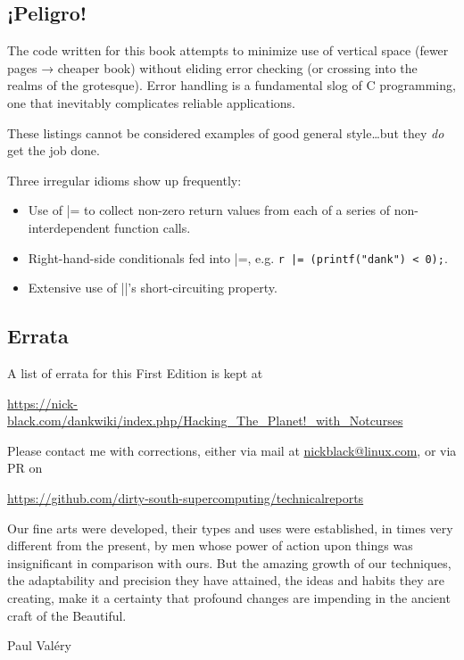 \documentclass[letterpaper,10pt]{article}
\newenvironment{denseitemize}{
  \begin{itemize}
      \setlength{\itemsep}{0pt}
}{
  \end{itemize}
}
\begin{document}
\subsection*{¡Peligro!}

The code written for this book attempts to minimize use of vertical space
(fewer pages → cheaper book) without eliding error checking (or crossing into
the realms of the grotesque). Error handling is a fundamental slog of C
programming, one that inevitably complicates reliable applications.

These listings cannot be considered examples of good general style\ldots but they \textit{do} get the job done.

Three irregular idioms show up frequently:

\begin{denseitemize}
\item{Use of |= to collect non-zero return values from each of a series of
      non-interdependent function calls.}
\item{Right-hand-side conditionals fed into |=, e.g. \texttt{r |= (printf("dank") < 0);}.}
\item{Extensive use of ||'s short-circuiting property.}
\end{denseitemize}

\subsection*{Errata}
A list of errata for this First Edition is kept at
\begin{center}
\url{https://nick-black.com/dankwiki/index.php/Hacking\_The\_Planet!\_with\_Notcurses}
\end{center}
Please contact me with corrections, either via mail at \href{mailto:nickblack@linux.com}{nickblack@linux.com},
or via PR on
\begin{center}
\url{https://github.com/dirty-south-supercomputing/technicalreports}
\end{center}

\clearpage

\epigraph{Our fine arts were developed, their types and uses were established, in times
very different from the present, by men whose power of action upon things was
insignificant in comparison with ours. But the amazing growth of our
techniques, the adaptability and precision they have attained, the ideas and
habits they are creating, make it a certainty that profound changes are
impending in the ancient craft of the Beautiful.}{Paul Valéry}
\end{document}
